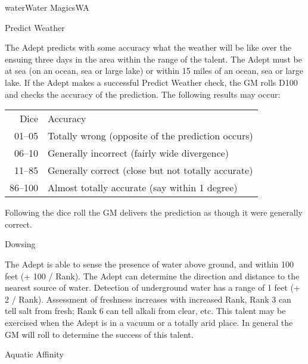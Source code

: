 \begin{college}[1.3]{water}{Water Magics}{WA}
\begin{talent}[T-1]{Predict Weather}
\begin{effects}
The Adept predicts with some accuracy what the weather will be like
over the ensuing three days in the area within the range of the
talent. The Adept must be at sea (on an ocean, sea or large lake) or
within 15 miles of an ocean, sea or large lake. If the Adept makes a
successful Predict Weather check, the GM rolls D100 and checks the
accuracy of the prediction. The following results may occur:

\begin{tabularx}{\linewidth}{rX}
Dice	& Accuracy \\
01--05	& Totally wrong (opposite of the prediction occurs) \\
06--10	& Generally incorrect (fairly wide divergence) \\
11--85	& Generally correct (close but not totally accurate) \\
86--100	& Almost totally accurate (say within 1 degree) \\
\end{tabularx}

Following the dice roll the GM delivers the prediction as though it
were generally correct.
\end{effects}
\end{talent}

\begin{talent}[T-2]{Dowsing}

\begin{effects}
The Adept is able to sense the presence of water above ground, and
within 100 feet (+ 100 / Rank). The Adept can determine the direction
and distance to the nearest source of water. Detection of underground
water has a range of 1 feet (+ 2 / Rank). Assessment of freshness
increases with increased Rank, \eg Rank 3 can tell salt from fresh;
Rank 6 can tell alkali from clear, etc. This talent may be exercised
when the Adept is in a vacuum or a totally arid place. In general the
GM will roll to determine the success of this talent.
\end{effects}
\end{talent}

\begin{talent}[T-3]{Aquatic Affinity}


\end{talent}
\end{college}
